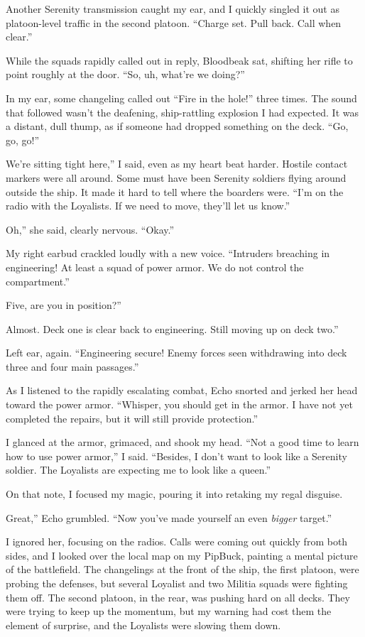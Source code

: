 Another Serenity transmission caught my ear, and I quickly singled it out as platoon-level traffic in the second platoon. “Charge set. Pull back. Call when clear.”

While the squads rapidly called out in reply, Bloodbeak sat, shifting her rifle to point roughly at the door. “So, uh, what’re we doing?”

In my ear, some changeling called out “Fire in the hole!” three times. The sound that followed wasn’t the deafening, ship-rattling explosion I had expected. It was a distant, dull thump, as if someone had dropped something on the deck. “Go, go, go!”

\leavevmode{}We’re sitting tight here,” I said, even as my heart beat harder. Hostile contact markers were all around. Some must have been Serenity soldiers flying around outside the ship. It made it hard to tell where the boarders were. “I’m on the radio with the Loyalists. If we need to move, they’ll let us know.”

\leavevmode{}Oh,” she said, clearly nervous. “Okay.”

My right earbud crackled loudly with a new voice. “Intruders breaching in engineering! At least a squad of power armor. We do not control the compartment.”

\leavevmode{}Five, are you in position?”

\leavevmode{}Almost. Deck one is clear back to engineering. Still moving up on deck two.”

Left ear, again. “Engineering secure! Enemy forces seen withdrawing into deck three and four main passages.”

As I listened to the rapidly escalating combat, Echo snorted and jerked her head toward the power armor. “Whisper, you should get in the armor. I have not yet completed the repairs, but it will still provide protection.”

I glanced at the armor, grimaced, and shook my head. “Not a good time to learn how to use power armor,” I said. “Besides, I don’t want to look like a Serenity soldier. The Loyalists are expecting me to look like a queen.”

On that note, I focused my magic, pouring it into retaking my regal disguise.

\leavevmode{}Great,” Echo grumbled. “Now you’ve made yourself an even \textit{bigger} target.”

I ignored her, focusing on the radios. Calls were coming out quickly from both sides, and I looked over the local map on my PipBuck, painting a mental picture of the battlefield. The changelings at the front of the ship, the first platoon, were probing the defenses, but several Loyalist and two Militia squads were fighting them off. The second platoon, in the rear, was pushing hard on all decks. They were trying to keep up the momentum, but my warning had cost them the element of surprise, and the Loyalists were slowing them down.

